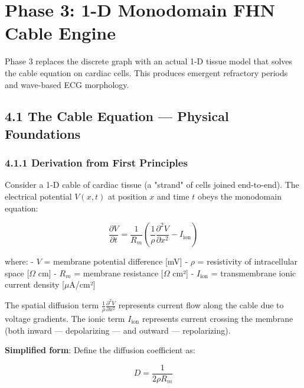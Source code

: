 
\chapter{Phase 3: 1-D Monodomain FHN Cable Engine}

Phase 3 replaces the discrete graph with an actual 1-D tissue model that solves the cable equation on cardiac cells. This produces emergent refractory periods and wave-based ECG morphology.

\section{4.1 The Cable Equation — Physical Foundations}

\subsection{4.1.1 Derivation from First Principles}

Consider a 1-D cable of cardiac tissue (a "strand" of cells joined end-to-end). The electrical potential $V(x, t)$ at position $x$ and time $t$ obeys the monodomain equation:

\begin{equation}
\frac{\partial V}{\partial t} = \frac{1}{R_m} \left( \frac{1}{\rho} \frac{\partial^2 V}{\partial x^2} - I_{\text{ion}} \right)
\label{eq:monodomain}
\end{equation}

where:
- $V$ = membrane potential difference [mV]
- $\rho$ = resistivity of intracellular space [\(\Omega\) cm]
- $R_m$ = membrane resistance [\(\Omega\) cm²]
- $I_{\text{ion}}$ = transmembrane ionic current density [\(\mu\)A/cm²]

The spatial diffusion term $\frac{1}{\rho} \frac{\partial^2 V}{\partial x^2}$ represents current flow along the cable due to voltage gradients. The ionic term $I_{\text{ion}}$ represents current crossing the membrane (both inward — depolarizing — and outward — repolarizing).

\textbf{Simplified form}: Define the diffusion coefficient as:

\begin{equation}
D = \frac{1}{2 \rho R_m}
\end{equation}

